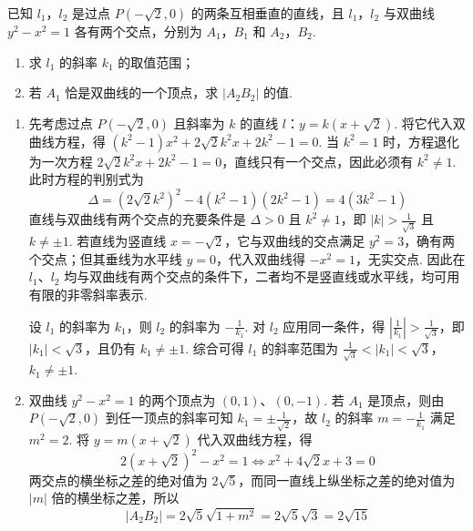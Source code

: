 \begin{problem}
已知 \(l_{1}\)，\(l_{2}\) 是过点 \(P\left(-\sqrt{2}, 0\right)\) 的两条互相垂直的直线，且 \(l_{1}\)，\(l_{2}\) 与双曲线 \(y^{2}-x^{2}=1\) 各有两个交点，分别为 \(A_{1}\)，\(B_{1}\) 和 \(A_{2}\)，\(B_{2}\).

\begin{enumerate}
\item 求 \(l_{1}\) 的斜率 \(k_{1}\) 的取值范围；
\item 若 \(A_{1}\) 恰是双曲线的一个顶点，求 \(\left|A_{2}B_{2}\right|\) 的值.
\end{enumerate}
\end{problem}

\begin{solution}
\begin{enumerate}
\item 先考虑过点 \(P\left(-\sqrt{2},0\right)\) 且斜率为 \(k\) 的直线 \(l\)：\(y=k\left(x+\sqrt{2}\right)\). 将它代入双曲线方程，得 \(\left(k^2-1\right)x^2+2\sqrt{2}k^2x+2k^2-1=0\). 当 \(k^2=1\) 时，方程退化为一次方程 \(2\sqrt{2}k^2x+2k^2-1=0\)，直线只有一个交点，因此必须有 \(k^2\ne1\). 此时方程的判别式为
\[
\Delta=\left(2\sqrt{2}k^2\right)^2-4\left(k^2-1\right)\left(2k^2-1\right)=4\left(3k^2-1\right)
\]
直线与双曲线有两个交点的充要条件是 \(\Delta>0\) 且 \(k^2\ne1\)，即 \(|k|>\frac{1}{\sqrt{3}}\) 且 \(k\ne\pm1\). 若直线为竖直线 \(x=-\sqrt{2}\)，它与双曲线的交点满足 \(y^2=3\)，确有两个交点；但其垂线为水平线 \(y=0\)，代入双曲线得 \(-x^2=1\)，无实交点. 因此在 \(l_1\)、\(l_2\) 均与双曲线有两个交点的条件下，二者均不是竖直线或水平线，均可用有限的非零斜率表示.

设 \(l_1\) 的斜率为 \(k_1\)，则 \(l_2\) 的斜率为 \(-\frac{1}{k_1}\). 对 \(l_2\) 应用同一条件，得 \(\left|\frac{1}{k_1}\right|>\frac{1}{\sqrt{3}}\)，即 \(|k_1|<\sqrt{3}\)，且仍有 \(k_1\ne\pm1\). 综合可得 \(l_1\) 的斜率范围为
\(\frac{1}{\sqrt{3}}<|k_1|<\sqrt{3}\)，\(k_1\ne\pm1\).

\item 双曲线 \(y^2-x^2=1\) 的两个顶点为 \(\left(0,1\right)\)、\(\left(0,-1\right)\). 若 \(A_1\) 是顶点，则由 \(P\left(-\sqrt{2},0\right)\) 到任一顶点的斜率可知 \(k_1=\pm\frac{1}{\sqrt{2}}\)，故 \(l_2\) 的斜率 \(m=-\frac{1}{k_1}\) 满足 \(m^2=2\). 将 \(y=m\left(x+\sqrt{2}\right)\) 代入双曲线方程，得
\[
2\left(x+\sqrt{2}\right)^2-x^2=1\Longleftrightarrow x^2+4\sqrt{2}x+3=0
\]
两交点的横坐标之差的绝对值为 \(2\sqrt{5}\)，而同一直线上纵坐标之差的绝对值为 \(|m|\) 倍的横坐标之差，所以
\[
\left|A_2B_2\right|=2\sqrt{5}\sqrt{1+m^2}=2\sqrt{5}\sqrt{3}=2\sqrt{15}
\]
\end{enumerate}
\end{solution}
